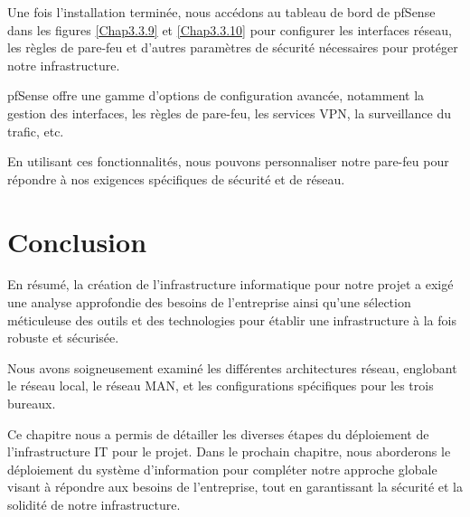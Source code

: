 Une fois l'installation terminée, nous accédons au tableau de bord de pfSense dans les figures \ref{Chap3.3.9} et \ref{Chap3.3.10} pour configurer les interfaces réseau, les règles de pare-feu et d'autres paramètres de sécurité nécessaires pour protéger notre infrastructure.

pfSense offre une gamme d'options de configuration avancée, notamment la gestion des interfaces, les règles de pare-feu, les services VPN, la surveillance du trafic, etc. 

En utilisant ces fonctionnalités, nous pouvons personnaliser notre pare-feu pour répondre à nos exigences spécifiques de sécurité et de réseau.

\section{Conclusion}

En résumé, la création de l'infrastructure informatique pour notre projet a exigé une analyse approfondie des besoins de l'entreprise ainsi qu'une sélection méticuleuse des outils et des technologies pour établir une infrastructure à la fois robuste et sécurisée. 

Nous avons soigneusement examiné les différentes architectures réseau, englobant le réseau local, le réseau MAN, et les configurations spécifiques pour les trois bureaux.

Ce chapitre nous a permis de détailler les diverses étapes du déploiement de l'infrastructure IT pour le projet. Dans le prochain chapitre, nous aborderons le déploiement du système d'information pour compléter notre approche globale visant à répondre aux besoins de l'entreprise, tout en garantissant la sécurité et la solidité de notre infrastructure.








